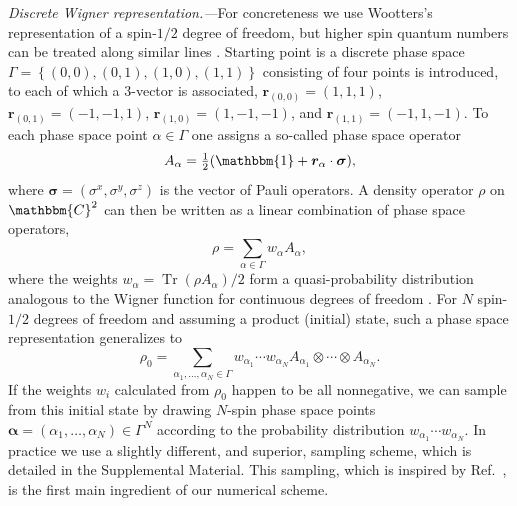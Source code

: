 \documentclass[aps,prl,showpacs,amsmath,amssymb,superscriptaddress,reprint,10pt]{revtex4-1}
\newcommand\CC{{\mathbbm{C}}}
\newcommand\id{{\mathbbm{1}}}
\newcommand{\mvec}[1]{\boldsymbol #1}
\DeclareMathOperator{\Tr}{{Tr}}
\begin{document}
{\em Discrete Wigner representation.---}For concreteness we use Wootters's representation of a spin-$1/2$ degree of freedom, but higher spin quantum numbers can be treated along similar lines \cite{Wootters87}. Starting point is a discrete phase space $\Gamma=\left\{(0,0),(0,1),(1,0),(1,1)\right\}$ consisting of four points is introduced, to each of which a 3-vector is associated, $\mvec{r}_{(0,0)}=(1,1,1)$, $\mvec{r}_{(0,1)}=(-1,-1,1)$, $\mvec{r}_{(1,0)}=(1,-1,-1)$, and $\mvec{r}_{(1,1)}=(-1,1,-1)$. To each phase space point $\alpha\in\Gamma$ one assigns a so-called phase space operator
\begin{equation}\label{e:Aalpha}
A_\alpha = \tfrac{1}{2}(\id+\mvec{r}_\alpha\cdot\mvec{\sigma}),
\end{equation}
where $\mvec{\sigma}=\left(\sigma^x,\sigma^y,\sigma^z\right)$ is the vector of Pauli operators. A density operator $\rho$ on $\CC^2$ can then be written  as a linear combination of phase space operators,
\begin{equation}
\rho=\sum_{\alpha\in\Gamma}w_\alpha A_\alpha,
\end{equation}
where the weights $w_\alpha=\Tr(\rho A_\alpha)/2$ form a quasi-probability distribution analogous to the Wigner function for continuous degrees of freedom \cite{Wootters87}. For $N$ spin-$1/2$ degrees of freedom and assuming a product (initial) state, such a phase space representation generalizes to
\begin{equation}
\rho_0=\sum_{\alpha_1,\dotsc,\alpha_N\in\Gamma}w_{\alpha_1}\cdots w_{\alpha_N}A_{\alpha_1}\otimes\cdots\otimes A_{\alpha_N}.
\end{equation}
If the weights $w_i$ calculated from $\rho_0$ happen to be all nonnegative, we can sample from this initial state by drawing $N$-spin phase space points $\mvec{\alpha}=(\alpha_1,\dotsc,\alpha_N)\in\Gamma^N$ according to the probability distribution $w_{\alpha_1}\cdots w_{\alpha_N}$. In practice we use a slightly different, and superior, sampling scheme, which is detailed in the Supplemental Material. This sampling, which is inspired by Ref.~\cite{Schachenmayer_etal15}, is the first main ingredient of our numerical scheme.
\end{document}
